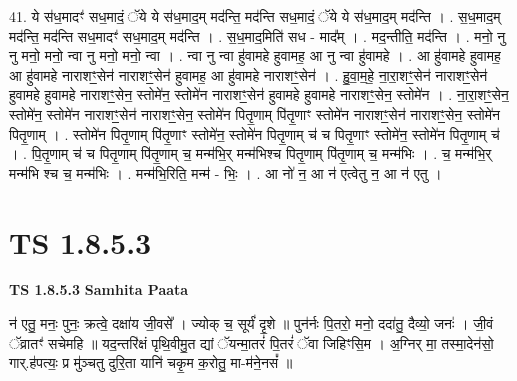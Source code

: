 \documentclass[17pt]{extarticle}
\begin{document}
41. ये स॑ध॒मादꣳ॑ सध॒मादं॒ ॅये ये स॑ध॒माद॒म् मद॑न्ति॒ मद॑न्ति सध॒मादं॒ ॅये ये स॑ध॒माद॒म् मद॑न्ति । . स॒ध॒माद॒म् मद॑न्ति॒ मद॑न्ति सध॒मादꣳ॑ सध॒माद॒म् मद॑न्ति । . स॒ध॒माद॒मिति॑ सध - माद᳚म् । . मद॒न्तीति॒ मद॑न्ति । . मनो॒ नु नु मनो॒ मनो॒ न्वा नु मनो॒ मनो॒ न्वा । . न्वा नु न्वा हु॑वामहे हुवामह॒ आ नु न्वा हु॑वामहे । . आ हु॑वामहे हुवामह॒ आ हु॑वामहे नाराशꣳ॒॒सेन॑ नाराशꣳ॒॒सेन॑ हुवामह॒ आ हु॑वामहे नाराशꣳ॒॒सेन॑ । . हु॒वा॒म॒हे॒ ना॒रा॒शꣳ॒॒सेन॑ नाराशꣳ॒॒सेन॑ हुवामहे हुवामहे नाराशꣳ॒॒सेन॒ स्तोमे॑न॒ स्तोमे॑न नाराशꣳ॒॒सेन॑ हुवामहे हुवामहे नाराशꣳ॒॒सेन॒ स्तोमे॑न । . ना॒रा॒शꣳ॒॒सेन॒ स्तोमे॑न॒ स्तोमे॑न नाराशꣳ॒॒सेन॑ नाराशꣳ॒॒सेन॒ स्तोमे॑न पितृ॒णाम् पि॑तृ॒णाꣳ स्तोमे॑न नाराशꣳ॒॒सेन॑ नाराशꣳ॒॒सेन॒ स्तोमे॑न पितृ॒णाम् । . स्तोमे॑न पितृ॒णाम् पि॑तृ॒णाꣳ स्तोमे॑न॒ स्तोमे॑न पितृ॒णाम् च॑ च पितृ॒णाꣳ स्तोमे॑न॒ स्तोमे॑न पितृ॒णाम् च॑ । . पि॒तृ॒णाम् च॑ च पितृ॒णाम् पि॑तृ॒णाम् च॒ मन्म॑भि॒र् मन्म॑भिश्च पितृ॒णाम् पि॑तृ॒णाम् च॒ मन्म॑भिः । . च॒ मन्म॑भि॒र् मन्म॑भि श्च च॒ मन्म॑भिः । . मन्म॑भि॒रिति॒ मन्म॑ - भिः॒ । . आ नो॑ न॒ आ न॑ एत्वेतु न॒ आ न॑ एतु । \newline
\pagebreak
{}
\section*{ TS 1.8.5.3 }

\textbf{TS 1.8.5.3 } \newline
\textbf{Samhita Paata} \newline

न॑ एतु॒ मनः॒ पुनः॒ क्रत्वे॒ दक्षा॑य जी॒वसे᳚ । ज्योक् च॒ सूर्यं॑ दृ॒शे ॥ पुन॑र्नः पि॒तरो॒ मनो॒ ददा॑तु॒ दैव्यो॒ जनः॑ । जी॒वं ॅव्रातꣳ॑ सचेमहि ॥ यद॒न्तरि॑क्षं पृथि॒वीमु॒त द्यां ॅयन्मा॒तरं॑ पि॒तरं॑ ॅवा जिहिꣳसि॒म । अ॒ग्निर् मा॒ तस्मा॒देन॑सो॒ गार्.ह॑पत्यः॒ प्र मु॑ञ्चतु दुरि॒ता यानि॑ चकृ॒म क॒रोतु॒ मा-म॑ने॒नसं᳚ ॥ \newline
\end{document}
